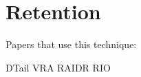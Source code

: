\section{Retention}
\label{sec:ret}

Papers that use this technique:

DTail\cite{dtail}
VRA
RAIDR
RIO\cite{rioparis}
